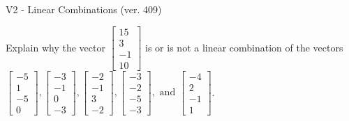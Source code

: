 \begin{exercise}
  \begin{exerciseTitle}V2 - Linear Combinations (ver. 409)\end{exerciseTitle}
  \begin{exerciseStatement}
    Explain why the vector \(\left[\begin{array}{c}
15 \\
3 \\
-1 \\
10
\end{array}\right]\)  is or is not a linear 
	combination of the vectors \(\left[\begin{array}{c}
-5 \\
1 \\
-5 \\
0
\end{array}\right] , \left[\begin{array}{c}
-3 \\
-1 \\
0 \\
-3
\end{array}\right] , \left[\begin{array}{c}
-2 \\
-1 \\
3 \\
-2
\end{array}\right] , \left[\begin{array}{c}
-3 \\
-2 \\
-5 \\
-3
\end{array}\right] , \text{ and } \left[\begin{array}{c}
-4 \\
2 \\
-1 \\
1
\end{array}\right]\).
	



\end{exerciseStatement}
\end{exercise}
